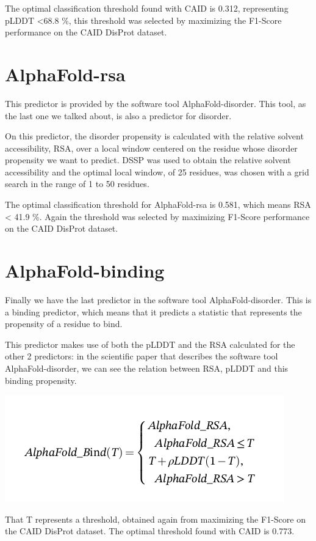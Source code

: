 The optimal classification threshold found with CAID is 0.312, representing pLDDT <68.8 \%, this threshold was selected by maximizing the F1-Score performance on the CAID DisProt dataset.
\section{AlphaFold-rsa}
This predictor is provided by the software tool AlphaFold-disorder. This tool, as the last one we talked about, is also a predictor for disorder.

On this predictor, the disorder propensity is calculated with the relative solvent accessibility, RSA, over a local window centered on the residue whose disorder propensity we want to predict. DSSP was used to obtain the relative solvent accessibility and the optimal local window, of 25 residues, was chosen with a grid search in the range of 1 to 50 residues.

The optimal classification threshold for AlphaFold-rsa is 0.581, which means RSA < 41.9 \%. Again the threshold was selected by maximizing F1-Score performance on the CAID DisProt dataset.

\pagebreak

\section{AlphaFold-binding}
Finally we have the last predictor in the software tool AlphaFold-disorder. This is a binding predictor, which means that it predicts a statistic that represents the propensity of a residue to bind.

This predictor makes use of both the pLDDT and the RSA calculated for the other 2 predictors: in the scientific paper \cite{alphafold-disorder} that describes the software tool AlphaFold-disorder, we can see the relation between RSA, pLDDT and this binding propensity.

\includegraphics[scale=.7]{res/alphafold-binding.png}

That T represents a threshold, obtained again from maximizing the F1-Score on the CAID DisProt dataset. The optimal threshold found with CAID is 0.773. 


